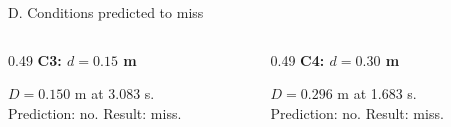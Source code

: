 \begin{frame}{D. Conditions predicted to miss}
\begin{columns}[T,onlytextwidth]
\begin{column}{0.49\textwidth}
\textbf{C3: $d=0.15$ m}\par\par\smallskip{}\par{}
\par\smallskip
\small $D=0.150$ m at 3.083 s.\\Prediction: no. Result: miss.
\end{column}
\begin{column}{0.49\textwidth}
\textbf{C4: $d=0.30$ m}\par\par\smallskip{}\par{}
\par\smallskip
\small $D=0.296$ m at 1.683 s.\\Prediction: no. Result: miss.
\end{column}
\end{columns}
\end{frame}


